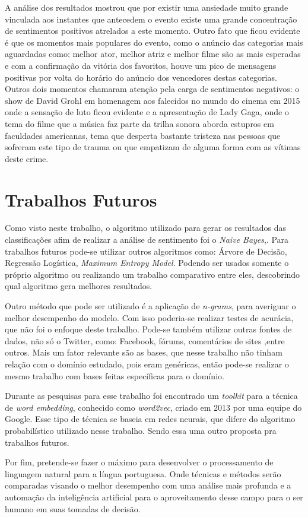 A análise dos resultados mostrou que por existir uma ansiedade muito grande vinculada aos instantes que antecedem o evento existe uma grande concentração de sentimentos positivos atrelados a este momento. Outro fato que ficou evidente é que os momentos mais populares do evento, como o anúncio das categorias mais aguardadas como: melhor ator, melhor atriz e melhor filme são as mais esperadas e com a confirmação da vitória dos favoritos, houve um pico de mensagens positivas por volta do horário do anúncio dos vencedores destas categorias. Outros dois momentos chamaram atenção pela carga de sentimentos negativos: o show de David Grohl em homenagem aos falecidos no mundo do cinema em 2015 onde a sensação de luto ficou evidente e a apresentação de Lady Gaga, onde o tema do filme que a música  faz parte da trilha sonora aborda estupros em faculdades americanas, tema que desperta bastante tristeza nas pessoas que sofreram este tipo de trauma ou que empatizam de alguma forma com as vítimas deste crime.


\section{Trabalhos Futuros}\label{sec:8_trabfut}

Como visto neste trabalho, o algoritmo utilizado para gerar os resultados das classificações afim de realizar a análise de sentimento foi o \textit{Naive Bayes},. Para trabalhos futuros pode-se utilizar outros algoritmos como: Árvore de Decisão, Regressão Logística, \textit{Maximum Entropy Model}. Podendo ser usados somente o próprio algoritmo ou realizando um trabalho comparativo entre eles, descobrindo qual algoritmo gera melhores resultados.

Outro método que pode ser utilizado é a aplicação de \textit{n-grams}, para averiguar o melhor desempenho do modelo. Com isso poderia-se realizar testes de acurácia, que não foi o enfoque deste trabalho. Pode-se também utilizar outras fontes de dados, não só o Twitter, como: Facebook, fórums, comentários de sites ,entre outros. Mais um fator relevante são as bases, que nesse trabalho não tinham relação com o domínio estudado, pois eram genéricas, então pode-se realizar o mesmo trabalho com bases feitas específicas para o domínio.

Durante as pesquisas para esse trabalho foi encontrado um \textit{toolkit}  para a técnica de \textit{word embedding}, conhecido como \textit{word2vec}, criado em 2013 por uma equipe do Google. Esse tipo de técnica se baseia em redes neurais, que difere do algoritmo probabilístico utilizado nesse trabalho. Sendo essa uma outro proposta pra trabalhos futuros.

Por fim, pretende-se fazer o máximo para desenvolver o  processamento de linguagem natural para a língua portuguesa. Onde técnicas e métodos serão comparadas visando o melhor desempenho com uma análise mais profunda e a automação da inteligência artificial para o aproveitamento desse campo para o ser humano em suas tomadas de decisão. 
